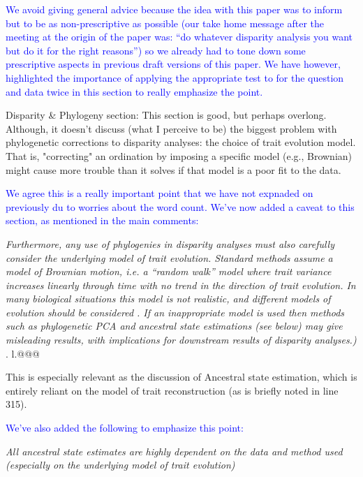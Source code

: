 \documentclass[12pt,letterpaper]{article}
\begin{document}
\textcolor{blue}{We avoid giving general advice because the idea with this paper was to inform but to be as non-prescriptive as possible (our take home message after the meeting at the origin of the paper was: ``do whatever disparity analysis you want but do it for the right reasons'') so we already had to tone down some prescriptive aspects in previous draft versions of this paper. We have however, highlighted the importance of applying the appropriate test to for the question and data twice in this section to really emphasize the point.}


\noindent Disparity \& Phylogeny section: This section is good, but perhaps overlong. Although, it doesn't discuss (what I perceive to be) the biggest problem with phylogenetic corrections to disparity analyses: the choice of trait evolution model.
That is, "correcting" an ordination by imposing a specific model (e.g., Brownian) might cause more trouble than it solves if that model is a poor fit to the data.

\textcolor{blue}{We agree this is a really important point that we have not expnaded on previously du to worries about the word count. We've now added a caveat to this section, as mentioned in the main comments:}

\textit{Furthermore, any use of phylogenies in disparity analyses must also carefully consider the underlying model of trait evolution. Standard methods assume a model of Brownian motion, i.e. a ``random walk'' model where trait variance increases linearly through time with no trend in the direction of trait evolution. In many biological situations this model is not realistic, and different models of evolution should be considered \citealt{blomberg2020}. If an inappropriate model is used then methods such as phylogenetic PCA and ancestral state estimations (see below) may give misleading results, with implications for downstream results of disparity analyses.)} . l.@@@

\noindent This is especially relevant as the discussion of Ancestral state estimation, which is entirely reliant on the model of trait reconstruction (as is briefly noted in line 315).

\textcolor{blue}{We've also added the following to emphasize this point:}

\textit{All ancestral state estimates are highly dependent on the data and method used (especially on the underlying model of trait evolution)}
\end{document}
